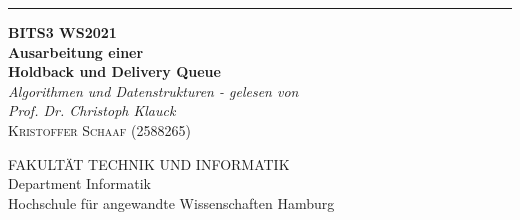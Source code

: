 \begin{titlepage} %
	
\raggedleft %
	
\rule{1pt}{\textheight} %
\hspace{0.05\textwidth} %
\parbox[b]{0.75\textwidth}{ %
		
	{\Huge\bfseries BITS3 WS2021 \\[0.5\baselineskip] Ausarbeitung einer \\Holdback und Delivery Queue}\\[2\baselineskip] %
	{\large\textit{Algorithmen und Datenstrukturen - gelesen von\\Prof. Dr. Christoph Klauck}}\\[4\baselineskip] %
	{\Large\textsc{Kristoffer Schaaf (2588265)}} %
		
	\vspace{0.5\textheight} %
		
	{\noindent FAKULTÄT TECHNIK UND INFORMATIK\\Department Informatik\\Hochschule für angewandte Wissenschaften Hamburg}\\[\baselineskip] %
}

\end{titlepage}